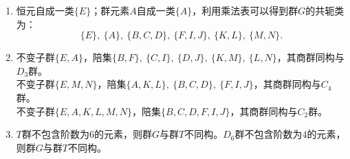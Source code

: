 \documentclass[reqno,a4paper,12pt]{amsart}
\begin{document}
\begin{enumerate}[1.]
\begin{tcolorbox}[breakable, colback = black!5!white, colframe = black]
\begin{enumerate}[(1)]
\item 恒元自成一类$\{E\}$；群元素$A$自成一类$\{A\}$，利用乘法表可以得到群$G$的共轭类为：
\[
	\{E\}, \ \{A\}, \ \{B, C, D\}, \ \{F, I, J\}, \ \{K, L\}, \ \{M, N\}.
\]

\item 不变子群$\{E, A\}$，陪集$\{B, F\}, \ \{C, I\}, \ \{D, J\}, \ \{K, M\}, \ \{L, N\}$，其商群同构与$D_3$群。\\
不变子群$\{E, M, N\}$，陪集$\{A, K, L\}, \ \{B, C, D\}, \ \{F, I, J\}$，其商群同构与$C_4$群。\\
不变子群$\{E, A, K, L, M, N\}$，陪集$\{B, C, D, F, I, J\}$，其商群同构与$C_2$群。

\item $T$群不包含阶数为$6$的元素，则群$G$与群$T$不同构。$D_6$群不包含阶数为$4$的元素，则群$G$与群$T$不同构。
\end{enumerate}
\end{tcolorbox}

\end{enumerate}
\end{document}
